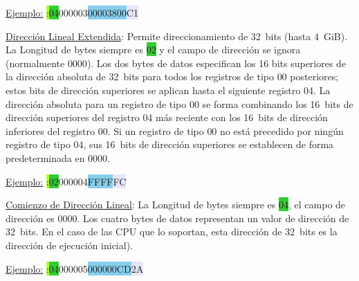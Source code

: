 \begin{description}
    
    \underline{Ejemplo:} \colorbox{GreenYellow}{:}\colorbox{LimeGreen}{04}\colorbox{Periwinkle}{0000}\colorbox{Peach}{03}\colorbox{SkyBlue}{00003800}\colorbox{Lavender}{C1}
    
    \item[04] \underline{Dirección Lineal Extendida}: Permite direccionamiento de 32~bits (hasta 4~GiB). La Longitud de bytes siempre es \colorbox{LimeGreen}{02} y el campo de dirección se ignora (normalmente \colorbox{Periwinkle}{0000}). Los dos bytes de datos especifican los 16 bits superiores de la dirección absoluta de 32~bits para todos los registros de tipo \colorbox{Peach}{00} posteriores; estos bits de dirección superiores se aplican hasta el siguiente registro \colorbox{Peach}{04}. La dirección absoluta para un registro de tipo \colorbox{Peach}{00} se forma combinando los 16~bits de dirección superiores del registro \colorbox{Peach}{04} más reciente con los 16~bits de dirección inferiores del registro \colorbox{Peach}{00}. Si un registro de tipo \colorbox{Peach}{00} no está precedido por ningún registro de tipo \colorbox{Peach}{04}, sus 16~bits de dirección superiores se establecen de forma predeterminada en \colorbox{Periwinkle}{0000}.
    
    \underline{Ejemplo:} \colorbox{GreenYellow}{:}\colorbox{LimeGreen}{02}\colorbox{Periwinkle}{0000}\colorbox{Peach}{04}\colorbox{SkyBlue}{FFFF}\colorbox{Lavender}{FC}
    
    \item[05] \underline{Comienzo de Dirección Lineal}: La Longitud de bytes siempre es \colorbox{LimeGreen}{04}, el campo de dirección es \colorbox{Periwinkle}{0000}. Los cuatro bytes de datos representan un valor de dirección de 32~bits. En el caso de las CPU que lo soportan, esta dirección de 32~bits es la dirección de ejecución inicial).
    
    \underline{Ejemplo:} \colorbox{GreenYellow}{:}\colorbox{LimeGreen}{04}\colorbox{Periwinkle}{0000}\colorbox{Peach}{05}\colorbox{SkyBlue}{000000CD}\colorbox{Lavender}{2A}
    
\end{description}